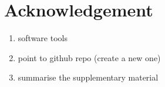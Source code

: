 \documentclass[]{interact}
\theoremstyle{plain}%
\theoremstyle{definition}
\theoremstyle{remark}
\providecommand{\tightlist}{%
  \setlength{\itemsep}{0pt}\setlength{\parskip}{0pt}}
\def\tightlist{}
\begin{document}
\hypertarget{acknowledgement}{%
\section{Acknowledgement}\label{acknowledgement}}

\begin{enumerate}
\def\labelenumi{\arabic{enumi}.}
\tightlist
\item
  software tools
\item
  point to github repo (create a new one)
\item
  summarise the supplementary material
\end{enumerate}

\newpage



\end{document}
